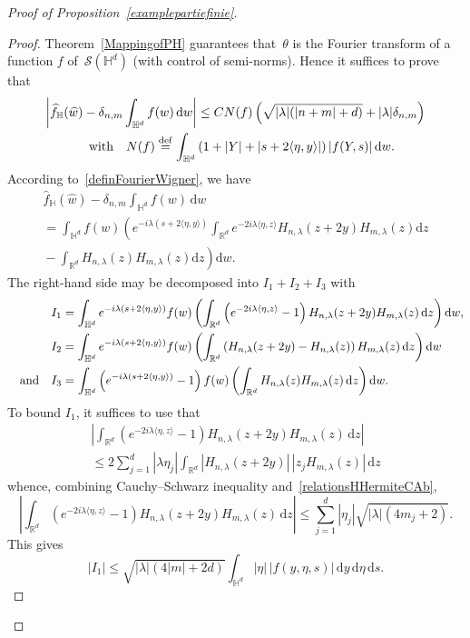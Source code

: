 \documentclass[10pt]{amsart}
\theoremstyle{definition}\newtheorem{defi}[theo]{Definition}\newtheorem{rema}[theo]{Remark}\newtheorem{exam}[theo]{Example}\newtheorem{exem}[theo]{Example}\newtheorem{nota}[theo]{Notation}
\newcommand{\lam}{\lambda}
\newcommand{\wh}{\widehat}
\newcommand*\cS{\mathcal{S}}
\newcommand*\R{\mathbb{R}}
\newcommand*\bbH{\mathbb{H}}
\newcommand{\andf}{\quad\hbox{and}\quad}
\newcommand{\with}{\quad\hbox{with}\quad}
\newcommand*\eqdefa{\overset{\mathrm{def}}{=}}
\newcommand*{\dd}{\mathrm{d}}
\newcommand{\ds}{\dd s}
\newcommand{\dw}{\dd w}
\newcommand{\dy}{\dd y}
\newcommand{\dz}{\dd z}
\newcommand{\deta}{\dd \eta}
\begin{document}
\begin{proof}[Proof of Proposition~\ref{examplepartiefinie}]
\begin{proof}
Theorem~\ref{MappingofPH} guarantees that~$\theta$ is the Fourier transform of a function $f$ of~$\cS(\bbH^d)$ (with control of semi-norms). Hence it suffices to prove that
\begin{multline*}
\left|\wh f_\bbH(\wh w)-\delta_{n,m}\int_{\bbH^d} f(w)\,\dw\right| \leq CN(f) \left(\sqrt{|\lam|(|n+m|+d)}+|\lam|\delta_{n,m}\right)\\
\with N(f)\eqdefa \int_{\bbH^d} \left(1+|Y| +|s+2\langle \eta,y\rangle|\right) |f(Y,s)| \,\dw.
\end{multline*}
According to~\eqref{definFourierWigner}, we have
\begin{multline*}
\wh f_\bbH(\wh w)-\delta_{n,m}\int_{\bbH^d} f(w)\,\dw \\ =\int_{\bbH^d} \! f(w)\left(e^{-i\lam(s\!+\!2\langle\eta,y\rangle)}\!\!
\int_{\R^d}\!e^{-2i\lam\langle\eta,z\rangle} H_{n,\lam}(z\!+\!2y)H_{m,\lam}(z)\dz\right.\\
\left.{}-\int_{\R^d}H_{n,\lam}(z) H_{m,\lam}(z)\dz\!\right)\dw.
\end{multline*}
The right-hand side may be decomposed into $I_1+I_2+I_3$ with
\[
\begin{aligned}
I_1&=\int_{\bbH^d} e^{-i\lam(s+2\langle\eta,y\rangle)}f(w)
\left(\int_{\R^d} \left(e^{-2i\lam\langle\eta,z\rangle}-1\right)H_{n,\lam}(z+2y)H_{m,\lam}(z)\,\dz\right)\dw,\\
I_2&=\int_{\bbH^d} e^{-i\lam(s+2\langle\eta,y\rangle)}f(w)
\left(\int_{\R^d} \left(H_{n,\lam}(z+2y)-H_{n,\lam}(z)\right)H_{m,\lam}(z)\,\dz\right)\dw\\
\andf I_3&=\int_{\bbH^d} \left(e^{-i\lam(s+2\langle\eta,y\rangle)}-1\right)f(w)\left(\int_{\R^d} H_{n,\lam}(z)H_{m,\lam}(z)\,\dz\right)\dw.
\end{aligned}
\]
To bound $I_1$, it suffices to use that
\begin{multline*}
\left|\int_{\R^d} \left(e^{-2i\lam\langle\eta,z\rangle}-1\right)H_{n,\lam}(z\!+\!2y)H_{m,\lam}(z)\,\dz\right|\\
\leq 2\sum_{j=1}^d |\lam\eta_j| \int_{\R^d} |H_{n,\lam}(z\!+\!2y)|\,|z_j H_{m,\lam}(z)|\,\dz
\end{multline*}
whence, combining Cauchy--Schwarz inequality and~\eqref{relationsHHermiteCAb},
\[
\left|\int_{\R^d} \left(e^{-2i\lam\langle\eta,z\rangle}-1\right)H_{n,\lam}(z+2y)H_{m,\lam}(z)\,\dz\right|
\leq \sum_{j=1}^d |\eta_j| \sqrt{|\lam|(4m_j+2)}.
\]
This gives
\begin{equation}\label{eq:I1}
|I_1|\leq \sqrt{|\lam|(4|m|+2d)}\int_{\bbH^d} |\eta|\,|f(y,\eta,s)|\,\dy\,\deta\,\ds.

\end{equation}
\end{proof}
\end{proof}
\end{document}
